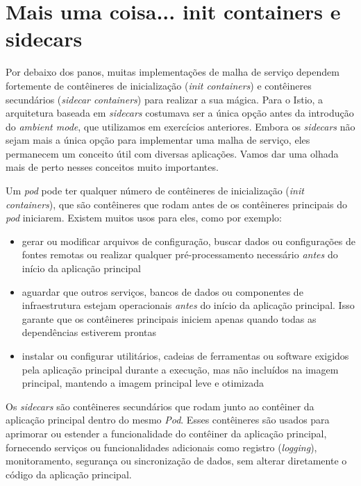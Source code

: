 \documentclass[11pt,a4paper]{article}
\begin{document}
\section*{\color{primary}Mais uma coisa... init containers e sidecars}

Por debaixo dos panos, muitas implementações de malha de serviço dependem fortemente de contêineres de inicialização (\textit{init containers}) e contêineres secundários (\textit{sidecar containers}) para realizar a sua mágica. Para o Istio, a arquitetura baseada em \textit{sidecars} costumava ser a única opção antes da introdução do \textit{ambient mode}, que utilizamos em exercícios anteriores. Embora os \textit{sidecars} não sejam mais a única opção para implementar uma malha de serviço, eles permanecem um conceito útil com diversas aplicações. Vamos dar uma olhada mais de perto nesses conceitos muito importantes.

Um \textit{pod} pode ter qualquer número de contêineres de inicialização (\textit{init containers}), que são contêineres que rodam antes de os contêineres principais do \textit{pod} iniciarem. Existem muitos usos para eles, como por exemplo:

\begin{itemize}
    \item gerar ou modificar arquivos de configuração, buscar dados ou configurações de fontes remotas ou realizar qualquer pré-processamento necessário \textit{antes} do início da aplicação principal
    \item aguardar que outros serviços, bancos de dados ou componentes de infraestrutura estejam operacionais \textit{antes} do início da aplicação principal. Isso garante que os contêineres principais iniciem apenas quando todas as dependências estiverem prontas
    \item instalar ou configurar utilitários, cadeias de ferramentas ou software exigidos pela aplicação principal durante a execução, mas não incluídos na imagem principal, mantendo a imagem principal leve e otimizada
\end{itemize}

Os \textit{sidecars} são contêineres secundários que rodam junto ao contêiner da aplicação principal dentro do mesmo \textit{Pod}. Esses contêineres são usados para aprimorar ou estender a funcionalidade do contêiner da aplicação principal, fornecendo serviços ou funcionalidades adicionais como registro (\textit{logging}), monitoramento, segurança ou sincronização de dados, sem alterar diretamente o código da aplicação principal.
\end{document}
